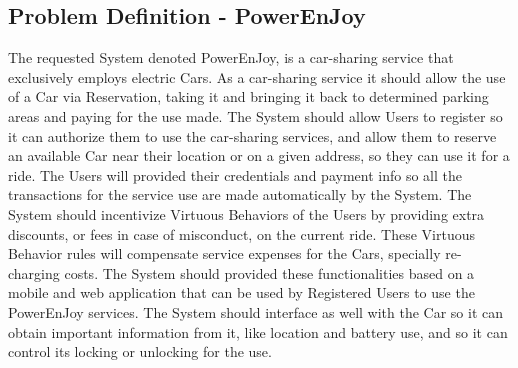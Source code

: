\documentclass[a4paper]{article}
\begin{document}
\subsection{Problem Definition - PowerEnJoy}
The requested System denoted PowerEnJoy, is a car-sharing service that  exclusively employs electric Cars. 
\newline\newline
As a car-sharing service it should allow the use of a Car via Reservation, taking it and bringing it back to determined parking areas and paying for the use made.
\newline\newline
The System should allow Users to register so it can authorize them to use the car-sharing services, and allow them to reserve an available Car near their location or on a given address, so they can use it for a ride. 
\newline\newline
The Users will provided their credentials and payment info so all the transactions for the service use are made automatically by the System.
\newline\newline
The System should incentivize Virtuous Behaviors of the Users by providing extra discounts, or fees in case of misconduct, on the current ride. These Virtuous Behavior rules will compensate service expenses for the Cars, specially re-charging costs.
\newline\newline
The System should provided these functionalities based on a mobile and web application that can be used by Registered Users to use the PowerEnJoy services. The System should interface as well with the Car so it can obtain important information from it, like location and battery use, and so it can control its locking or unlocking for the use.
\end{document}
